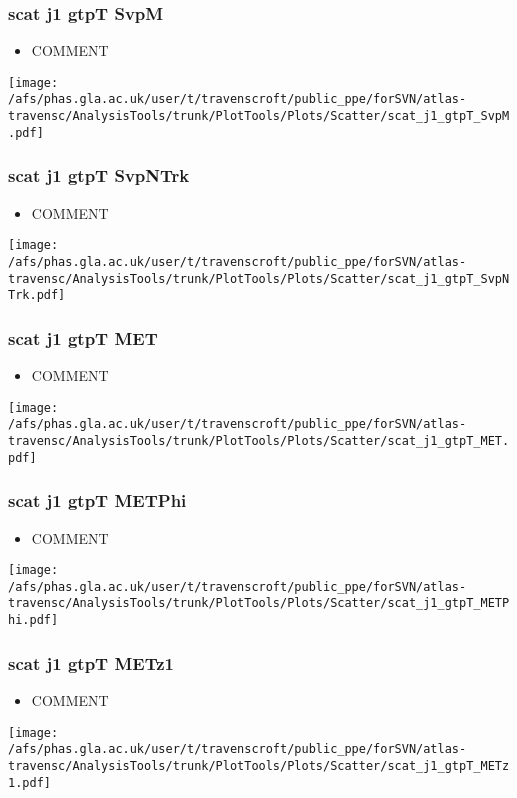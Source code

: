 \documentclass{beamer}
\begin{document}
\begin{frame}
\frametitle{scat j1 gtpT SvpM}
\begin{itemize}
\item COMMENT
\end{itemize}
\begin{center}
\texttt{[image: /afs/phas.gla.ac.uk/user/t/travenscroft/public\_ppe/forSVN/atlas-travensc/AnalysisTools/trunk/PlotTools/Plots/Scatter/scat\_j1\_gtpT\_SvpM.pdf]}
\end{center}
\end{frame}

\begin{frame}
\frametitle{scat j1 gtpT SvpNTrk}
\begin{itemize}
\item COMMENT
\end{itemize}
\begin{center}
\texttt{[image: /afs/phas.gla.ac.uk/user/t/travenscroft/public\_ppe/forSVN/atlas-travensc/AnalysisTools/trunk/PlotTools/Plots/Scatter/scat\_j1\_gtpT\_SvpNTrk.pdf]}
\end{center}
\end{frame}

\begin{frame}
\frametitle{scat j1 gtpT MET}
\begin{itemize}
\item COMMENT
\end{itemize}
\begin{center}
\texttt{[image: /afs/phas.gla.ac.uk/user/t/travenscroft/public\_ppe/forSVN/atlas-travensc/AnalysisTools/trunk/PlotTools/Plots/Scatter/scat\_j1\_gtpT\_MET.pdf]}
\end{center}
\end{frame}

\begin{frame}
\frametitle{scat j1 gtpT METPhi}
\begin{itemize}
\item COMMENT
\end{itemize}
\begin{center}
\texttt{[image: /afs/phas.gla.ac.uk/user/t/travenscroft/public\_ppe/forSVN/atlas-travensc/AnalysisTools/trunk/PlotTools/Plots/Scatter/scat\_j1\_gtpT\_METPhi.pdf]}
\end{center}
\end{frame}

\begin{frame}
\frametitle{scat j1 gtpT METz1}
\begin{itemize}
\item COMMENT
\end{itemize}
\begin{center}
\texttt{[image: /afs/phas.gla.ac.uk/user/t/travenscroft/public\_ppe/forSVN/atlas-travensc/AnalysisTools/trunk/PlotTools/Plots/Scatter/scat\_j1\_gtpT\_METz1.pdf]}
\end{center}
\end{frame}
\end{document}
